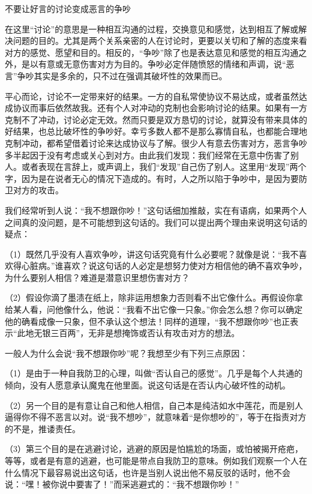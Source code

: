 \documentclass[12pt,UTF8]{ctexbook}
\begin{document}
不要让好言的讨论变成恶言的争吵


在这里“讨论”的意思是一种相互沟通的过程，交换意见和感觉，达到相互了解或解决问题的目的。尤其是两个关系亲密的人在讨论时，更要以关切和了解的态度来看对方的感觉、愿望和目的。相反的，“争吵”除了也是表达意见和感觉的相互沟通之外，是以有意或无意伤害对方为目的。争吵必定伴随愤怒的情绪和声调，说“恶言”争吵其实是多余的，只不过在强调其破坏性的效果而已。

平心而论，讨论不一定带来好的结果。一方的自私常使协议不易达成，或者虽然达成协议而事后依然故我。还有个人对冲动的克制也会影响讨论的结果。如果有一方克制不了冲动，讨论必定无效。然而只要是双方恳切的讨论，就算没有带来具体的好结果，也总比破坏性的争吵好。幸亏多数人都不是那么寡情自私，也都能合理地克制冲动，都希望借着讨论来达成协议与了解。很少人有意去伤害对方，恶言争吵多半起因于没有考虑或关心到对方。由此我们发现：我们经常在无意中伤害了别人。或者表现在言辞上，或声调上，我们“发现”自己伤了别人。这里用“发现”两个字，因为是在说者无心的情况下造成的。有时，人之所以陷于争吵中，是因为要防卫对方的攻击。

我们经常听到人说：“我不想跟你吵！”这句话细加推敲，实在有语病，如果两个人之间真的没问题，是不可能想到这句话的。我们可以提出两个理由来说明这句话的疑点：

（1）既然几乎没有人喜欢争吵，讲这句话究竟有什么必要呢？就像是说：“我不喜欢得心脏病。”谁喜欢？说这句话的人必定是想努力使对方相信他的确不喜欢争吵，为什么要别人相信？难道是潜意识里想伤害对方？

（2）假设你滴了墨渍在纸上，除非运用想象力否则看不出它像什么。再假设你拿给某人看，问他像什么，他说：“我看不出它像一只象。”你会怎么想？你可以确定他的确看成像一只象，但不承认这个想法！同样的道理，“我不想跟你吵”也正表示“此地无银三百两”，无非是想掩饰或否认有攻击对方的想法。

一般人为什么会说“我不想跟你吵”呢？我想至少有下列三点原因：

（1）是由于一种自我防卫的心理，叫做“否认自己的感觉”。几乎是每个人共通的倾向，没有人愿意承认魔鬼在他里面。说这句话是在否认内心破坏性的动机。

（2）另一个目的是有意让自己和他人相信，自己本是纯洁如水中莲花，而是别人逼得你不得不恶言以对。说“我不想吵”，就意味着“是你想吵的”，等于在指责对方的不是，推诿责任。

（3）第三个目的是在逃避讨论，逃避的原因是怕尴尬的场面，或怕被揭开疮疤，等等，或者是有意的逃避，也可能是带点自我防卫的意味。例如我们观察一个人在什么情况下最容易说出这句话，也许是当别人说出他不易反驳的话时，他不会说：“嘿！被你说中要害了！”而采逃避式的：“我不想跟你吵！”
\end{document}
